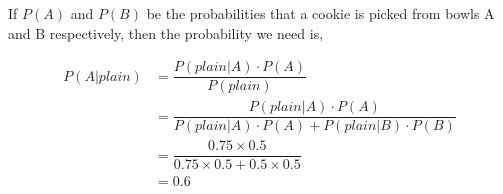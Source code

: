 \begin{solution}[\halfpage]
	If $P(A)$ and $P(B)$ be the probabilities that a cookie is picked from bowls A and B respectively,
	then the probability we need is, 
	
	\begin{align}
		P(A \vert plain) &= \dfrac{P(plain \vert A) \cdot P(A)}{P(plain)} \\
		  &= \dfrac{P(plain \vert A) \cdot P(A)}{P(plain \vert A)\cdot P(A) + P(plain \vert B)\cdot P(B)} \\
		  &= \dfrac{0.75 \times 0.5}{0.75\times 0.5 + 0.5\times 0.5} \\
		  &= 0.6
	\end{align}

\end{solution}
